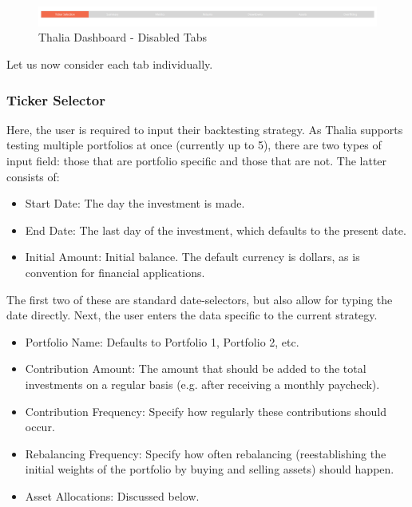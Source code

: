 \documentclass[main.tex]{subfiles}
\begin{document}
\begin{figure}[H]
   \centering
   \includegraphics[width=\textwidth]{08Appendices/081User/081Pictures/disabled_tabs.png}
   \caption{Thalia Dashboard - Disabled Tabs}
   \label{thalia_disabled_tabs}
\end{figure}

Let us now consider each tab individually. 

\subsubsection{Ticker Selector}

\label{create_portfolio}

Here, the user is required to input their backtesting strategy. As Thalia supports testing multiple portfolios at once (currently up to 5), there are two types of input field: those that are portfolio specific and those that are not. The latter consists of:

\begin{itemize}
    \item Start Date: The day the investment is made.
    \item End Date: The last day of the investment, which defaults to the present date.
    \item Initial Amount: Initial balance. The default currency is dollars, as is convention for financial applications.
\end{itemize}

The first two of these are standard date-selectors, but also allow for typing the date directly. Next, the user enters the data specific to the current strategy.

\begin{itemize}
    \item Portfolio Name: Defaults to Portfolio 1, Portfolio 2, etc. 
    \item Contribution Amount: The amount that should be added to the total investments on a regular basis (e.g. after receiving a monthly paycheck).
    \item Contribution Frequency: Specify how regularly these contributions should occur.
    \item Rebalancing Frequency: Specify how often rebalancing (reestablishing the initial weights of the portfolio by buying and selling assets) should happen. 
    \item Asset Allocations: Discussed below.
\end{itemize}
\end{document}
